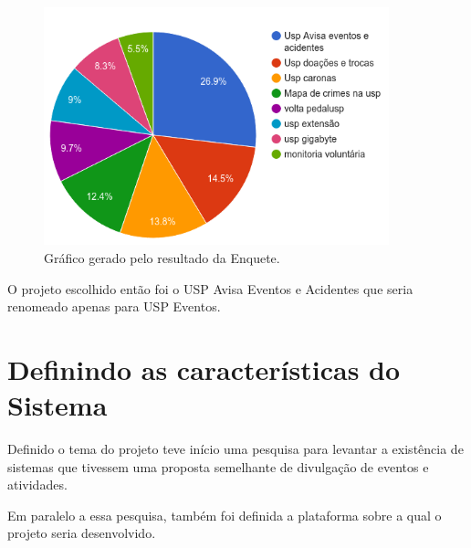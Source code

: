 \begin{figure}[htb]
\centering
\includegraphics[width=10cm]{figuras/poll_chart}
\caption{\label{fig:poll_chart} Gráfico gerado pelo resultado da Enquete.}
\end{figure}
\par O projeto escolhido então foi o USP Avisa Eventos e Acidentes que seria renomeado apenas para USP Eventos.
\section{Definindo as características do Sistema}
\par Definido o tema do projeto teve início uma pesquisa para levantar a existência de sistemas que tivessem uma proposta semelhante de divulgação de eventos e atividades.
\par Em paralelo a essa pesquisa, também foi definida a plataforma sobre a qual o projeto seria desenvolvido.
